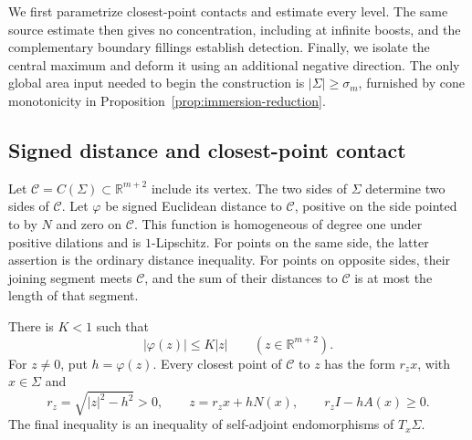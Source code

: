 We first parametrize closest-point contacts and estimate every level.
The same source estimate then gives no concentration, including at
infinite boosts, and the complementary boundary fillings establish
detection. Finally, we isolate the central maximum and deform it using
an additional negative direction. The only global area input needed
to begin the construction is $|\Sigma|\ge\sigma_m$, furnished by cone
monotonicity in Proposition~\ref{prop:immersion-reduction}.

\subsection{Signed distance and closest-point contact}

Let $\mathcal C=C(\Sigma)\subset\mathbb R^{m+2}$ include its vertex.
The two sides of $\Sigma$ determine two sides of $\mathcal C$.
Let $\varphi$ be signed Euclidean distance to $\mathcal C$, positive on
the side pointed to by $N$ and zero on $\mathcal C$.
This function is homogeneous of degree one under positive dilations and
is $1$-Lipschitz.  For points on the same side, the latter assertion is
the ordinary distance inequality.  For points on opposite sides, their
joining segment meets $\mathcal C$, and the sum of their distances to
$\mathcal C$ is at most the length of that segment.

\begin{lemma}\label{lem:family-cone-contact}
There is $K<1$ such that
\begin{equation}\label{eq:family-spacelike-bound}
 |\varphi(z)|\le K|z|\qquad(z\in\mathbb R^{m+2}).
\end{equation}
For $z\ne0$, put $h=\varphi(z)$.  Every closest point of $\mathcal C$ to
$z$ has the form $r_zx$, with $x\in\Sigma$ and
\begin{equation}\label{eq:family-contact}
 r_z=\sqrt{|z|^2-h^2}>0,\qquad
 z=r_zx+hN(x),\qquad r_z I-hA(x)\ge0.
\end{equation}
The final inequality is an inequality of self-adjoint endomorphisms of
$T_x\Sigma$.
\end{lemma}

